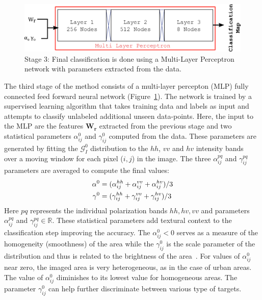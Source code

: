 \begin{figure}
\centering
	\includegraphics[width =  0.8 \columnwidth]{Figures/Trento/Method3}
	\caption[PolSAR data preprocessing Stage 3]{Stage 3: Final classification is done using a Multi-Layer Perceptron network with parameters extracted from the data.}
	\label{fig:method3}
\end{figure}
	

The third stage of the method consists of a multi-layer percepton (MLP) fully connected feed forward neural network (Figure~\ref{fig:method3}). The network is trained by a supervised learning algorithm that takes training data and labels as input and attempts to classify unlabeled additional unseen data-points. Here, the input to the MLP are the features $\bm{W_r}$ extracted from the previous stage and two statistical parameters $\alpha^0_{ij}$ and $\gamma^0_{ij}$ computed from the data. These parameters are generated by fitting the $\mathcal{G}^0_I$ distribution to the $hh$, $vv$ and $hv$ intensity bands~\cite{Frery97hetroclutter} over a moving window for each pixel ($i,j$) in the image. The three $\alpha^{pq}_{ij}$ and $\gamma^{pq}_{ij}$ parameters are averaged to compute the final values:
\begin{align}
\alpha^0 &= (\alpha^{hh}_{ij} + \alpha^{vv}_{ij} + \alpha^{hv}_{ij} )/3 \\ \label{eqn:stats}
\gamma^0 &= (\gamma^{hh}_{ij} + \gamma^{vv}_{ij} + \gamma^{hv}_{ij} )/3  \notag 
\end{align}
Here $pq$ represents the individual polarization bands ${hh,hv,vv}$ and parameters $\alpha^{pq}_{ij}$ and $\gamma^{pq}_{ij} \in \mathbb{R}$. These statistical parameters add textural context to the classification step improving the accuracy. The $\alpha^0_{ij} < 0$ serves as a measure of the homogeneity (smoothness) of the area while the  $\gamma^0_{ij}$ is the scale parameter of the distribution and thus is related to the brightness of the area~\cite{frery1999models}. For values of $\alpha^0_{ij}$ near zero, the imaged area is very heterogeneous, as in the case of urban areas. The value of $\alpha^0_{ij}$ diminishes to its lowest value for homogeneous areas. The parameter $\gamma^0_{ij}$ can help further discriminate between various type of targets.



